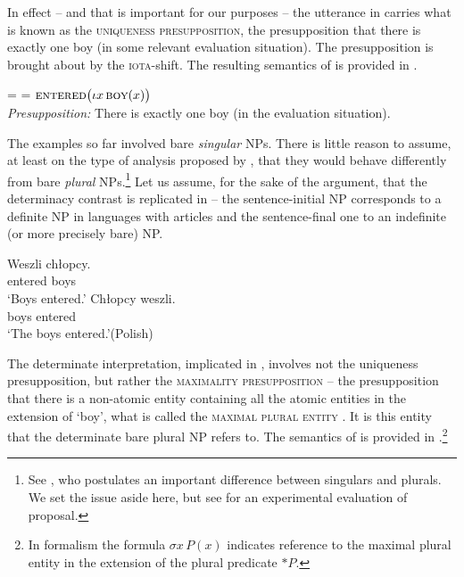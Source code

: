 \documentclass[output=paper]{langscibook}
\begin{document}
In effect -- and that is important for our purposes -- the utterance in  carries what is known as the \textsc{uniqueness presupposition}, the presupposition that there is exactly one boy (in some relevant evaluation situation). The presupposition is brought about by the \textsc{iota}-shift. The resulting semantics of  is provided in .

\ea {} =  = $\textsc{entered}\big(\iota x\,\textsc{boy}(x)\big)$\label{sim-dem:ex:denot-initial}\\
\textit{Presupposition:} There is exactly one boy (in the evaluation situation).
\z

\noindent The examples so far involved bare \textit{singular} NPs. There is little reason to assume, at least on the type of analysis proposed by \citet{Geist2010}, that they would behave differently from bare \textit{plural} NPs.\footnote{See \citet{Dayal2004}, who postulates an important difference between singulars and plurals. We set the issue aside here, but see \citet{Simik.Demian2020} for an experimental evaluation of  proposal.} Let us assume, for the sake of the argument, that the determinacy contrast is replicated in  -- the sentence-initial NP corresponds to a definite NP in languages with articles and the sentence-final one to an indefinite (or more precisely bare) NP.

\ea\label{sim-dem:ex:plural}\ea\gll Weszli chłopcy.\label{sim-dem:ex:plural-a}\\
entered boys\\
\glt `Boys entered.'
\ex\gll Chłopcy weszli.\label{sim-dem:ex:plural-b}\\
boys entered\\
\glt `The boys entered.'\hfill (Polish)
\z\z

\noindent The determinate interpretation, implicated in , involves not the uniqueness presupposition, but rather the \textsc{maximality presupposition} -- the presupposition that there is a non-atomic entity containing all the atomic entities in the extension of `boy', what is called the \textsc{maximal plural entity} \citep{Sharvy1980,Link1983}. It is this entity that the determinate bare plural NP refers to. The semantics of  is provided in .\footnote{In  formalism the formula $\sigma x\,P(x)$ indicates reference to the maximal plural entity in the extension of the plural predicate $\text{*}P$.}
\end{document}

